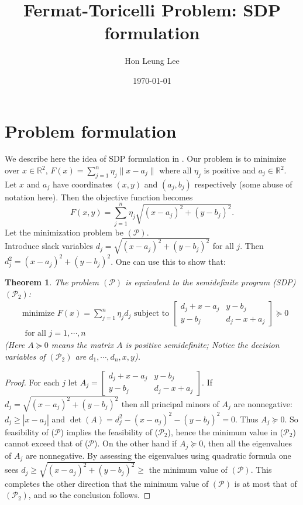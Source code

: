 \documentclass[11pt,letter]{article}
\newtheorem{thm}{Theorem}
\numberwithin{equation}{section}
\newcommand{\dis}{\displaystyle}
\newcommand{\R}{\mathbb{R}}
\begin{document}
\title{Fermat-Toricelli Problem: SDP formulation}
\author{Hon Leung Lee}
\date{\today}
\maketitle

\section{Problem formulation}

We describe here the idea of SDP formulation in \cite{NPS}. Our problem is to minimize 
over $x\in \R^2$, $\dis F(x) = \sum_{j=1}^n \eta_j \|x-a_j\|$ where all $\eta_j$ is positive and $a_j \in \R^2$. 
Let $x$ and $a_j$ have coordinates $(x,y)$ and $(a_j,b_j)$ respectively (some abuse of notation here).
Then the objective function  becomes
$$
F(x,y) = \sum_{j=1}^ n \eta_j \sqrt{(x-a_j)^2 + (y- b_j)^2}.
$$
Let the minimization problem be $(\mathcal{P})$. \\

Introduce slack variables $d_j = \sqrt{(x-a_j)^2 + (y- b_j)^2}$ for all $j$. Then 
$d_j^2  = (x-a_j)^2 + (y- b_j)^2 $. One can use this to show that:

\begin{thm}
The problem $(\mathcal{P})$ is equivalent to the semidefinite program (SDP) $(\mathcal{P}_2)$:
\begin{align*}
& \text{minimize } F(x) = \sum_{j=1}^n \eta_j d_j \text{ subject to }
\begin{bmatrix}
d_j + x - a_j & y - b_j \\
y - b_j & d_j - x + a_j
\end{bmatrix}
\succeq 0 \\
&  \text{ for all }j = 1,\cdots,n
\end{align*}
(Here $A \succeq 0$ means the matrix $A$ is positive semidefinite; Notice 
the decision variables of $(\mathcal{P}_2)$ are $d_1,\cdots,d_n,x,y$).
\end{thm}


\begin{proof}
For each $j$ let $A_j = \begin{bmatrix}
d_j + x - a_j & y - b_j \\
y - b_j & d_j - x + a_j
\end{bmatrix}$. If\\ $d_j = \sqrt{(x-a_j)^2 + (y-b_j)^2}$ then all principal minors of 
$A_j$ are nonnegative:
$d_j \geq |x-a_j|$ and $\dis \det (A)= d_j^2 - (x-a_j)^2 - (y-b_j)^2 = 0$. Thus $A_j\succeq 0$. So feasibility of ($\mathcal{P}$) implies 
the feasibility of ($\mathcal{P}_2$), hence the minimum value in ($\mathcal{P}_2$) cannot exceed that of ($\mathcal{P}$). 
On the other hand if  $A_j \succeq 0$, then all the eigenvalues of $A_j$ are nonnegative. By assessing the eigenvalues using quadratic formula one sees $d_j \geq \sqrt{(x-a_j)^2 + (y-b_j)^2} \geq$ the minimum value of $(\mathcal{P})$. 
This completes the other direction that the minimum value of $(\mathcal{P})$ is at most that of $(\mathcal{P}_2)$, and 
so the conclusion follows.
\end{proof}
\end{document}
